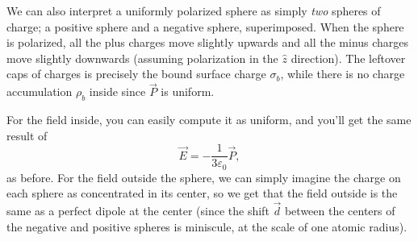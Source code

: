 \begin{remark}
We can also interpret a uniformly polarized sphere as simply \textit{two} spheres of charge; a positive sphere and a negative sphere, superimposed. When the sphere is polarized, all the plus charges move slightly upwards and all the minus charges move slightly downwards (assuming polarization in the $\hat{z}$ direction). The leftover caps of charges is precisely the bound surface charge $\sigma_b$, while there is no charge accumulation $\rho_b$ inside since $\vec{P}$ is uniform.

For the field inside, you can easily compute it as uniform, and you'll get the same result of 
\[\vec{E}=-\frac{1}{3\varepsilon_0}\vec{P},\]
as before. For the field outside the sphere, we can simply imagine the charge on each sphere as concentrated in its center, so we get that the field outside is the same as a perfect dipole at the center (since the shift $\vec{d}$ between the centers of the negative and positive spheres is miniscule, at the scale of one atomic radius).
\end{remark}







